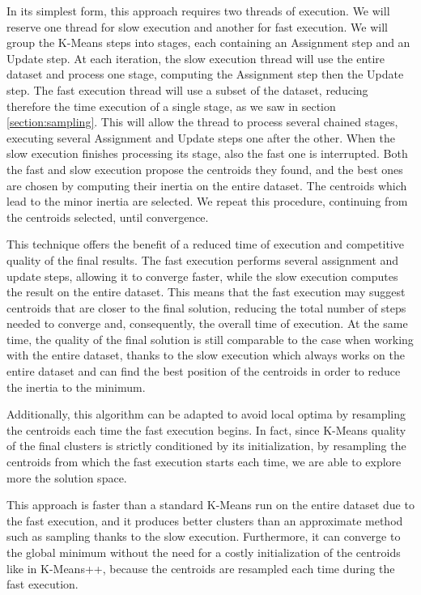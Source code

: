 In its simplest form, this approach requires two threads of execution. We will reserve one thread for slow execution and another for fast execution. We will group the K-Means steps into stages, each containing an Assignment step and an Update step. At each iteration, the slow execution thread will use the entire dataset and process one stage, computing the Assignment step then the Update step. The fast execution thread will use a subset of the dataset, reducing therefore the time execution of a single stage, as we saw in section \ref{section:sampling}. This will allow the thread to process several chained stages, executing several Assignment and Update steps one after the other.
When the slow execution finishes processing its stage, also the fast one is interrupted.
Both the fast and slow execution propose the centroids they found, and the best ones are chosen by computing their inertia on the entire dataset. The centroids which lead to the minor inertia are selected.
We repeat this procedure, continuing from the centroids selected, until convergence.

This technique offers the benefit of a reduced time of execution and competitive quality of the final results.
The fast execution performs several assignment and update steps, allowing it to converge faster, while the slow execution computes the result on the entire dataset. This means that the fast execution may suggest centroids that are closer to the final solution, reducing the total number of steps needed to converge and, consequently, the overall time of execution. 
At the same time, the quality of the final solution is still comparable to the case when working with the entire dataset, thanks to the slow execution which always works on the entire dataset and can find the best position of the centroids in order to reduce the inertia to the minimum.

Additionally, this algorithm can be adapted to avoid local optima by resampling the centroids each time the fast execution begins. In fact, since K-Means quality of the final clusters is strictly conditioned by its initialization, by resampling the centroids from which the fast execution starts each time, we are able to explore more the solution space.

This approach is faster than a standard K-Means run on the entire dataset due to the fast execution, and it produces better clusters than an approximate method such as sampling thanks to the slow execution. Furthermore, it can converge to the global minimum without the need for a costly initialization of the centroids like in K-Means++, because the centroids are resampled each time during the fast execution.